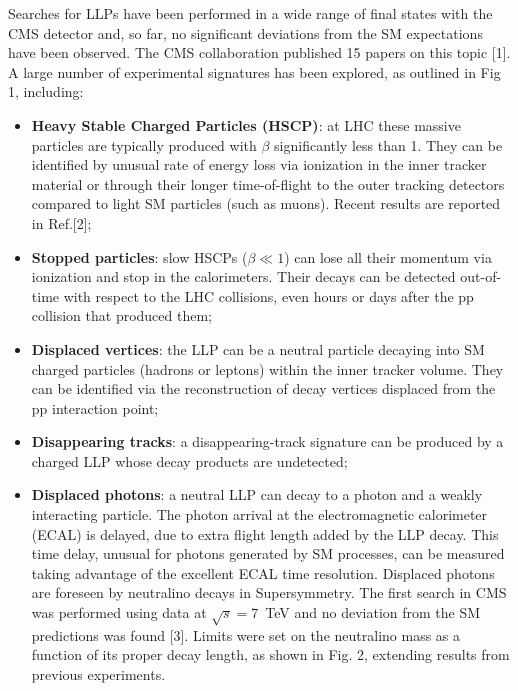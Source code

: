 \documentclass[twocolumn,twoside,10pt,nodate]{article}
\begin{document}
Searches for LLPs have been performed in a
wide range of final states with the CMS detector 
and, so far, no significant deviations from the SM
expectations have been observed. The CMS collaboration published 
15 papers on this topic [1]. A large number of experimental 
signatures has been explored, as outlined in Fig 1, including:
\begin{itemize}
\item {\bf Heavy Stable Charged Particles (HSCP)}: at LHC these massive 
particles are typically produced with $\beta$ significantly less than
1. They can be
identified by unusual rate of energy loss via ionization in the inner
tracker material or through their 
longer time-of-flight to the outer tracking detectors
compared to light SM particles (such as muons). 
Recent results are reported in Ref.[2];
\item {\bf Stopped particles}: slow HSCPs ($\beta \ll 1$) can lose all 
their momentum via ionization and stop in the calorimeters. 
  Their decays can be detected out-of-time with respect to the
  LHC collisions, even hours or days after the pp collision that produced
  them;
\item {\bf Displaced vertices}: the LLP can be a neutral particle
  decaying into SM charged particles (hadrons or leptons) within the
  inner tracker volume. They can be identified via the reconstruction
  of decay vertices displaced from the pp interaction point;
\item {\bf Disappearing tracks}: a disappearing-track signature can be produced by a
  charged LLP whose decay products are undetected;
\item {\bf Displaced photons}: a neutral LLP can decay to a photon and a weakly
  interacting particle. 
The photon arrival at
  the electromagnetic calorimeter (ECAL) is delayed, due to extra flight
  length added by the LLP decay. This time delay, unusual for photons
  generated by SM processes, can be measured taking advantage of the
  excellent ECAL time resolution. Displaced photons are foreseen by
  neutralino decays in Supersymmetry. 
The first search in CMS was performed using data at
$\sqrt{s}=7$~TeV and no deviation from the SM predictions was found [3].
Limits were set on the neutralino mass as a function of its proper
decay length, as shown in Fig. 2, extending results from previous experiments.
\end{itemize}
\end{document}
